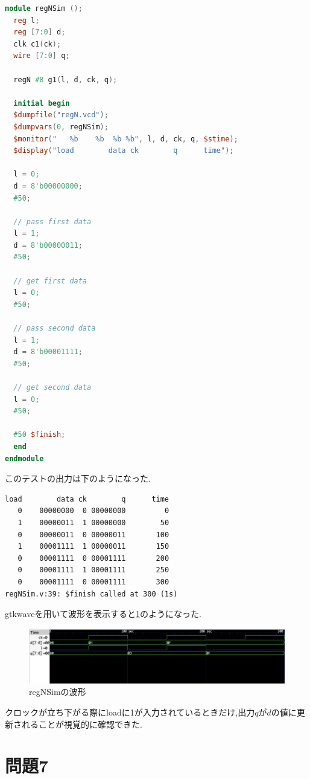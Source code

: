 \documentclass[autodetect-engine, dvi=dvipdfmx, 10pt, a4paper, ja=standard]{bxjsarticle}
\begin{document}
\begin{lstlisting}[language={Verilog}, caption={モジュールregNSimのVerilogコード}, label={code:mod-regnsim}]
  module regNSim ();
  reg l;
  reg [7:0] d;
  clk c1(ck);
  wire [7:0] q;

  regN #8 g1(l, d, ck, q);

  initial begin
  $dumpfile("regN.vcd");
  $dumpvars(0, regNSim);
  $monitor("   %b    %b  %b %b", l, d, ck, q, $stime);
  $display("load        data ck        q      time");

  l = 0;
  d = 8'b00000000;
  #50;

  // pass first data
  l = 1;
  d = 8'b00000011;
  #50;

  // get first data
  l = 0;
  #50;

  // pass second data
  l = 1;
  d = 8'b00001111;
  #50;

  // get second data
  l = 0;
  #50;

  #50 $finish;
  end
endmodule
\end{lstlisting}

このテストの出力は下のようになった.

\begin{verbatim}
load        data ck        q      time
   0    00000000  0 00000000         0
   1    00000011  1 00000000        50
   0    00000011  0 00000011       100
   1    00001111  1 00000011       150
   0    00001111  0 00001111       200
   0    00001111  1 00001111       250
   0    00001111  0 00001111       300
regNSim.v:39: $finish called at 300 (1s)
\end{verbatim}

gtkwaveを用いて波形を表示すると\ref{fig:ex6-wave}のようになった.

\begin{figure}[H]
	\centering
	\includegraphics[width=\textwidth]{ex6-wave.png}
	\caption{regNSimの波形}
	\label{fig:ex6-wave}
\end{figure}

クロックが立ち下がる際にloadに1が入力されているときだけ,出力$q$が$d$の値に更新されることが視覚的に確認できた.

\section{問題7}
\end{document}

